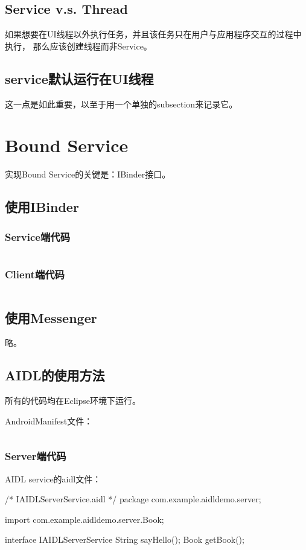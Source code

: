 ﻿\documentclass[a4paper,11pt]{article}
\begin{document}
  \subsection[Service v.s. Thread]{Service v.s. Thread}
  如果想要在UI线程以外执行任务，并且该任务只在用户与应用程序交互的过程中执行，
  那么应该创建线程而非Service。
  
  \subsection[service默认运行在UI线程]{service默认运行在UI线程}
  这一点是如此重要，以至于用一个单独的subsection来记录它。
  
  \section[Bound Service]{Bound Service}\label{sec:boundservice}
  实现Bound Service的关键是：IBinder接口。
  \subsection[使用IBinder]{使用IBinder}
  \subsubsection[Service端代码]{Service端代码}
  \inputminted[linenos,tabsize=4,bgcolor=srcbg]{java}{LocalService.java}
  
  \subsubsection[Client端代码]{Client端代码}
  \inputminted[linenos,tabsize=4,bgcolor=srcbg]{java}{BindingActivity.java}
  
  \subsection[使用Messenger]{使用Messenger}
  略。

  \subsection[AIDL的使用方法]{AIDL的使用方法}
  所有的代码均在Eclipse环境下运行。\par\bigskip
  AndroidManifest文件：\par
  \inputminted[linenos,tabsize=4,bgcolor=srcbg]{xml}{AIDLManifest.xml}

  \subsubsection[Server端代码]{Server端代码}
  AIDL service的aidl文件：\par
  \begin{javacode}
/* IAIDLServerService.aidl */
package com.example.aidldemo.server;

import com.example.aidldemo.server.Book;

interface IAIDLServerService {
    String sayHello();
    Book getBook();
}
  \end{javacode}
\end{document}
